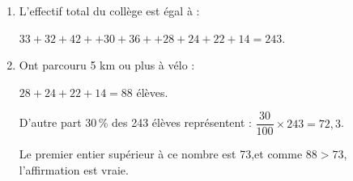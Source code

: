 \begin{enumerate}
	\begin{enumerate}
	\item %
	L'effectif total du collège est égal à :
	
	$33 + 32 + 42 + + 30 + 36 +  + 28 +  24 + 22 + 14 = 243$.
	\item %

Ont parcouru 5 km ou plus à vélo : 

$28 + 24 + 22 + 14 = 88$ élèves.

D'autre part 30\,\% des 243 élèves représentent : $\dfrac{30}{100} \times 243 = 72,3$.

Le premier entier supérieur à ce nombre est 73,et comme $88 > 73$, l'affirmation est vraie.

	\end{enumerate}
\end{enumerate}

\bigskip
